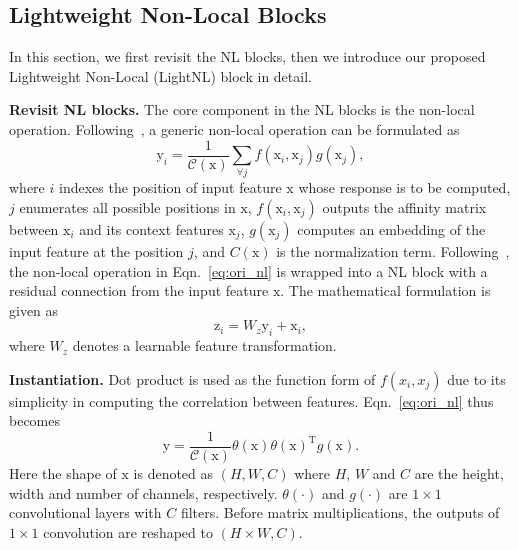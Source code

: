\documentclass[10pt,twocolumn,letterpaper]{article}
\newcommand{\ma}[1]{\mathrm{#1}} \newcommand{\songbai}[1]{ \textcolor{red}{(song bai: #1)}  }
\begin{document}
\subsection{Lightweight Non-Local Blocks}
\label{sec:LSAM}
In this section, we first revisit the NL blocks, then we introduce our proposed Lightweight Non-Local (LightNL) block in detail.

\vspace{0.5ex}\noindent\textbf{Revisit NL blocks.} The core component in the NL blocks is the non-local operation. Following~\cite{wang2018non}, a generic non-local operation can be formulated as
\begin{equation} \label{eq:ori_nl}
    \ma{y}_i = \frac{1}{\mathcal{C(\ma{x})}} \sum_{\forall j}f(\ma{x}_i, \ma{x}_j)g(\ma{x}_j),
\end{equation}
where $i$ indexes the position of input feature $\ma{x}$ whose response is to be computed, $j$ enumerates all possible positions in $\ma{x}$, $f(\ma{x}_i, \ma{x}_j)$ outputs the affinity matrix between $\ma{x}_i$ and its context features $\ma{x}_j$, $g(\ma{x}_j)$ computes an embedding of the input feature at the position $j$, and $C(\ma{x})$ is the normalization term. Following~\cite{wang2018non}, the non-local operation in Eqn.~\eqref{eq:ori_nl} is wrapped into a NL block with a residual connection from the input feature $\ma{x}$. The mathematical formulation is given as
\begin{equation} \label{eq:residual}
    \ma{z}_i = W_z\ma{y}_i + \ma{x}_i,
\end{equation}
where $W_z$ denotes a learnable feature transformation.

\vspace{0.5ex}\noindent\textbf{Instantiation.}
Dot product is used as the function form of $f(x_i, x_j)$ due to its simplicity in computing the correlation between features. Eqn.~\eqref{eq:ori_nl} thus becomes
\begin{equation} \label{eq:matrix_nl}
    \ma{y}=\frac{1}{\mathcal{C}(\ma{x})}\theta(\ma{x})\theta(\ma{x})^\mathrm{T}g(\ma{x}).
\end{equation}
Here the shape of $\ma{x}$ is denoted as $(H, W, C)$ where $H$, $W$ and $C$ are the height, width and number of channels, respectively. $\theta(\cdot)$ and $g(\cdot)$ are $1\times 1$ convolutional layers with $C$ filters. Before matrix multiplications, the outputs of $1\times 1$ convolution are reshaped to $(H\times W, C)$. 
\end{document}
